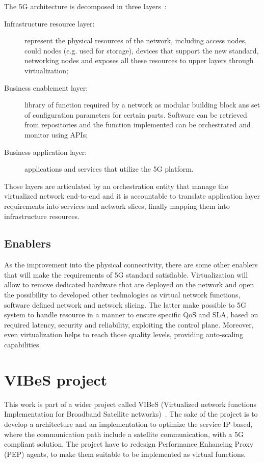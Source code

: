 The 5G architecture is decomposed in three layers~\cite{alliance20155g}:
\begin{description}
\item [Infrastructure resource layer:] represent the physical resources of the
network, including access nodes, could nodes (e.g. used for storage), devices
that support the new standard, networking nodes and exposes all these resources
to upper layers through virtualization;

\item [Business enablement layer:] library of function required by a network as
modular building block ans set of configuration parameters for certain parts.
Software can be retrieved from repositories and the function implemented can be
orchestrated and monitor using APIs;

\item[Business application layer:] applications and services that utilize the 5G
platform.
\end{description}

Those layers are articulated by an orchestration entity that manage the
virtualized network end-to-end and it is accountable to translate application
layer requirements into services and network slices, finally mapping them into
infrastructure resources.

\subsection{Enablers}
As the improvement into the physical connectivity, there are some other enablers
that will make the requirements of 5G standard satisfiable. Virtualization will
allow to remove dedicated hardware that are deployed on the network and open
the possibility to developed other technologies as virtual network functions,
software defined network and network slicing. The latter make possible to 5G
system to handle resource in a manner to ensure specific QoS and SLA, based on
required latency, security and reliability, exploiting the control plane.
Moreover, even virtualization helps to reach those quality levels, providing
auto-scaling capabilities.

\section{VIBeS project}
This work is part of a wider project called VIBeS (Virtualized network functions
Implementation for Broadband Satellite networks)~\cite{vibesesa}. The sake of
the project is to develop a architecture and an implementation to optimize the
service IP-based, where the communication path include a satellite
communication, with a 5G compliant solution. The project have to redesign
Performance Enhancing Proxy (PEP) agents, to make them suitable to be
implemented as virtual functions. 

